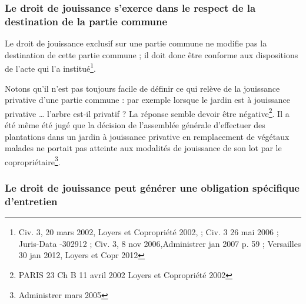 		\subsubsection{Le droit de jouissance s’exerce dans le respect de la destination de la partie commune}
		
			Le droit de jouissance exclusif sur une partie commune ne modifie pas la destination de cette partie
			commune ; il doit donc être conforme aux dispositions de l’acte qui l’a institué\footnote{Civ. 3\degre{}, 20 mars 2002, Loyers et Copropriété 2002,  ; Civ. 3\degre{} 26 mai 2006 ; Juris-Data -302912 ; Civ. 3\degre{}, 8 nov 2006,Administrer jan 2007 p. 59 ; Versailles 30 jan 2012, Loyers et Copr 2012 }.
		
			Notons qu’il n’est pas toujours facile de définir ce qui relève de la jouissance privative d’une partie
			commune : par exemple lorsque le jardin est à jouissance privative … l’arbre est-il privatif ? La réponse
			semble devoir être négative\footnote{PARIS 23\degre{} Ch B 11 avril 2002 Loyers et Copropriété 2002 }. Il a été même été jugé que la décision de l'assemblée générale d’effectuer
			des plantations dans un jardin à jouissance privative en remplacement de végétaux malades ne portait pas
			atteinte aux modalités de jouissance de son lot par le copropriétaire\footnote{Administrer  mars 2005}.
		
		\subsubsection{Le droit de jouissance peut générer une obligation spécifique d’entretien}
		
